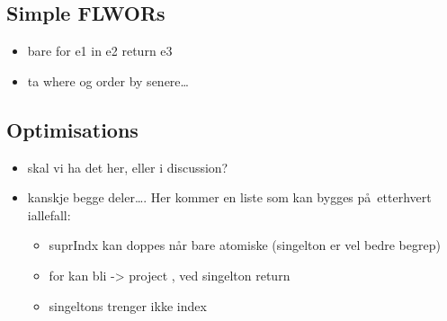 \subsection{Simple FLWORs}
\label{sect:trans:TD:simpleFLWOR}
\begin{itemize}
  \item bare for e1 in e2 return e3
  \item ta where og order by senere\ldots
\end{itemize}

\subsection{Optimisations}
\label{sect:trans:optimisations}
\begin{itemize}
  \item skal vi ha det her, eller i discussion?
  \item kanskje begge deler\ldots. Her kommer en liste som kan bygges p\aa~etterhvert iallefall:
	  \begin{itemize}
	    \item suprIndx kan doppes n\aa r bare atomiske (singelton er vel bedre begrep)
	    \item for kan bli -> project , ved singelton return
	    \item singeltons trenger ikke index
	  \end{itemize} 
\end{itemize}